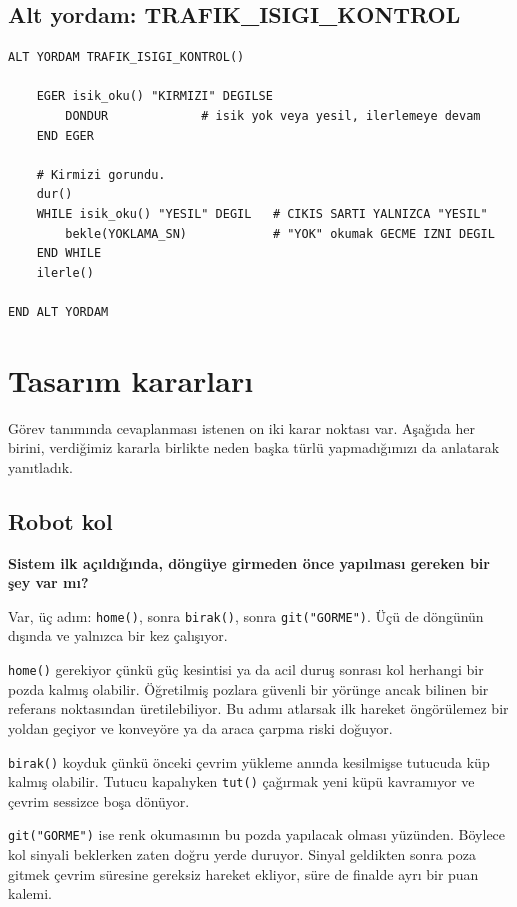 \documentclass[11pt,a4paper]{article}
\newcommand{\ey}[1]{\texttt{#1}}
\begin{document}
\subsection*{Alt yordam: TRAFIK\_ISIGI\_KONTROL}

\begin{verbatim}
ALT YORDAM TRAFIK_ISIGI_KONTROL()

    EGER isik_oku() "KIRMIZI" DEGILSE
        DONDUR             # isik yok veya yesil, ilerlemeye devam
    END EGER

    # Kirmizi gorundu.
    dur()
    WHILE isik_oku() "YESIL" DEGIL   # CIKIS SARTI YALNIZCA "YESIL"
        bekle(YOKLAMA_SN)            # "YOK" okumak GECME IZNI DEGIL
    END WHILE
    ilerle()

END ALT YORDAM
\end{verbatim}

\clearpage

\section{Tasarım kararları}

Görev tanımında cevaplanması istenen on iki karar noktası var. Aşağıda her
birini, verdiğimiz kararla birlikte neden başka türlü yapmadığımızı da
anlatarak yanıtladık.

\subsection*{Robot kol}

\textbf{Sistem ilk açıldığında, döngüye girmeden önce yapılması gereken bir şey
var mı?}

Var, üç adım: \ey{home()}, sonra \ey{birak()}, sonra \ey{git("GORME")}. Üçü de
döngünün dışında ve yalnızca bir kez çalışıyor.

\ey{home()} gerekiyor çünkü güç kesintisi ya da acil duruş sonrası kol herhangi
bir pozda kalmış olabilir. Öğretilmiş pozlara güvenli bir yörünge ancak bilinen
bir referans noktasından üretilebiliyor. Bu adımı atlarsak ilk hareket
öngörülemez bir yoldan geçiyor ve konveyöre ya da araca çarpma riski doğuyor.

\ey{birak()} koyduk çünkü önceki çevrim yükleme anında kesilmişse tutucuda küp
kalmış olabilir. Tutucu kapalıyken \ey{tut()} çağırmak yeni küpü kavramıyor ve
çevrim sessizce boşa dönüyor.

\ey{git("GORME")} ise renk okumasının bu pozda yapılacak olması yüzünden.
Böylece kol sinyali beklerken zaten doğru yerde duruyor. Sinyal geldikten sonra
poza gitmek çevrim süresine gereksiz hareket ekliyor, süre de finalde ayrı bir
puan kalemi.
\end{document}
